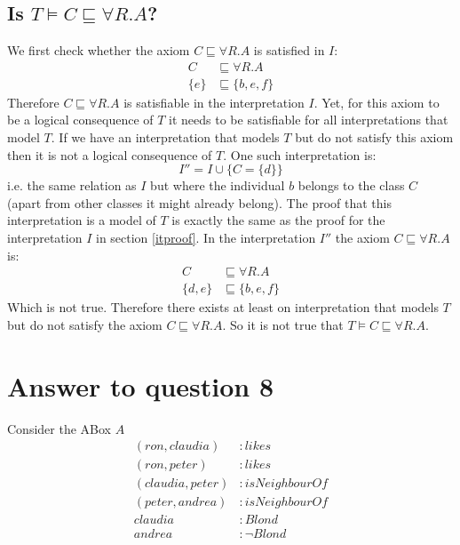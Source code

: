 \documentclass[a4paper,12pt]{article}
\begin{document}
\subsection[Consequence]{Is $ T \models C \sqsubseteq \forall R.A $?}
We first check whether the axiom $ C \sqsubseteq \forall R.A $ is satisfied in
$I$:
\begin{align*}
    C &\sqsubseteq \forall R.A\\
\{e\} &\sqsubseteq \{b,e,f\}
\end{align*}
Therefore $ C \sqsubseteq \forall R.A $ is satisfiable in the interpretation
$I$.  Yet, for this axiom to be a logical consequence of $T$ it needs to be
satisfiable for all interpretations that model $T$.  If we have an
interpretation that models $T$ but do not satisfy this axiom then it is not a
logical consequence of $T$.  One such interpretation is:
\begin{equation*}
I'' = I \cup \{ C = \{d\} \}
\end{equation*}
i.e. the same relation as $I$ but where the individual $b$ belongs to the class
$C$ (apart from other classes it might already belong).  The proof that this
interpretation is a model of $T$ is exactly the same as the proof for the
interpretation $I$ in section \ref{itproof}.  In the interpretation $I''$ the
axiom $ C \sqsubseteq \forall R.A $ is:
\begin{align*}
      C &\sqsubseteq \forall R.A\\
\{d,e\} &\sqsubseteq \{b,e,f\}
\end{align*}
Which is not true.  Therefore there exists at least on interpretation that
models $T$ but do not satisfy the axiom $ C \sqsubseteq \forall R.A $.  So it
is not true that $ T \models C \sqsubseteq \forall R.A $.

\section[Question 8]{Answer to question 8}

Consider the ABox $A$
\begin{align*}
(ron,claudia)   &: likes\\
(ron,peter)     &: likes\\
(claudia,peter) &: isNeighbourOf\\
(peter,andrea)  &: isNeighbourOf\\
claudia         &: Blond\\
andrea          &: \neg Blond
\end{align*}
\end{document}
